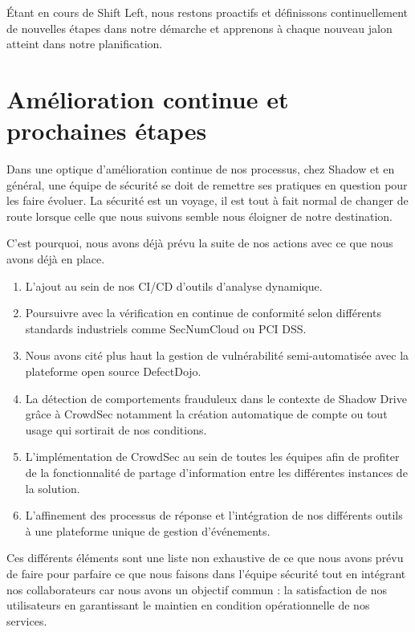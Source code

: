\documentclass[
  11pt,
  a4paper,
  krantz2,
  11pt,
  oneside]{krantz}
\begin{document}
Étant en cours de Shift Left, nous restons proactifs et définissons continuellement de nouvelles étapes dans notre démarche et apprenons à chaque nouveau jalon atteint dans notre planification.

\section{Amélioration continue et prochaines étapes}\label{amuxe9lioration-continue-et-prochaines-uxe9tapes}

Dans une optique d'amélioration continue de nos processus, chez Shadow et en général, une équipe de sécurité se doit de remettre ses pratiques en question pour les faire évoluer. La sécurité est un voyage, il est tout à fait normal de changer de route lorsque celle que nous suivons semble nous éloigner de notre destination.

C'est pourquoi, nous avons déjà prévu la suite de nos actions avec ce que nous avons déjà en place.

\begin{enumerate}
\def\labelenumi{\roman{enumi}.}
\item
  L'ajout au sein de nos CI/CD d'outils d'analyse dynamique.
\item
  Poursuivre avec la vérification en continue de conformité selon différents standards industriels comme SecNumCloud ou PCI DSS.
\item
  Nous avons cité plus haut la gestion de vulnérabilité semi-automatisée avec la plateforme open source DefectDojo.
\item
  La détection de comportements frauduleux dans le contexte de Shadow Drive grâce à CrowdSec notamment la création automatique de compte ou tout usage qui sortirait de nos conditions.
\item
  L'implémentation de CrowdSec au sein de toutes les équipes afin de profiter de la fonctionnalité de partage d'information entre les différentes instances de la solution.
\item
  L'affinement des processus de réponse et l'intégration de nos différents outils à une plateforme unique de gestion d'événements.
\end{enumerate}

Ces différents éléments sont une liste non exhaustive de ce que nous avons prévu de faire pour parfaire ce que nous faisons dans l'équipe sécurité tout en intégrant nos collaborateurs car nous avons un objectif commun : la satisfaction de nos utilisateurs en garantissant le maintien en condition opérationnelle de nos services.
\end{document}
